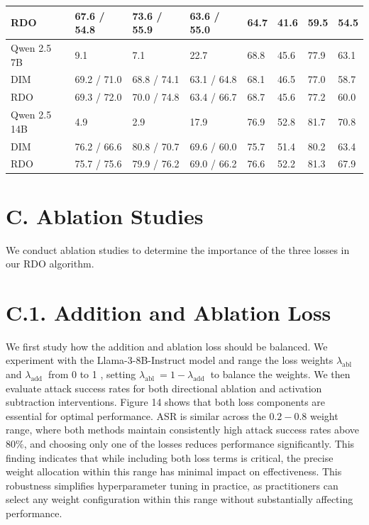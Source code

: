 \documentclass[10pt]{article}
\begin{document}
\begin{table}[h]
\begin{center}
\begin{tabular}{|l|l|l|l|l|l|l|l|}
\hline
RDO & 67.6 / 54.8 & 73.6 / 55.9 & 63.6 / 55.0 & 64.7 & 41.6 & 59.5 & 54.5 \\
\hline
Qwen 2.5 7B & 9.1 & 7.1 & 22.7 & 68.8 & 45.6 & 77.9 & 63.1 \\
\hline
DIM & 69.2 / 71.0 & 68.8 / 74.1 & 63.1 / 64.8 & 68.1 & 46.5 & 77.0 & 58.7 \\
\hline
RDO & 69.3 / 72.0 & 70.0 / 74.8 & 63.4 / 66.7 & 68.7 & 45.6 & 77.2 & 60.0 \\
\hline
Qwen 2.5 14B & 4.9 & 2.9 & 17.9 & 76.9 & 52.8 & 81.7 & 70.8 \\
\hline
DIM & 76.2 / 66.6 & 80.8 / 70.7 & 69.6 / 60.0 & 75.7 & 51.4 & 80.2 & 63.4 \\
\hline
RDO & 75.7 / 75.6 & 79.9 / 76.2 & 69.0 / 66.2 & 76.6 & 52.2 & 81.3 & 67.9 \\
\hline
\end{tabular}
\end{center}
\end{table}

\section*{C. Ablation Studies}
We conduct ablation studies to determine the importance of the three losses in our RDO algorithm.

\section*{C.1. Addition and Ablation Loss}
We first study how the addition and ablation loss should be balanced. We experiment with the Llama-3-8B-Instruct model and range the loss weights $\lambda_{\text {abl }}$ and $\lambda_{\text {add }}$ from 0 to 1 , setting $\lambda_{\text {abl }}=1-\lambda_{\text {add }}$ to balance the weights. We then evaluate attack success rates for both directional ablation and activation subtraction interventions. Figure 14 shows that both loss components are essential for optimal performance. ASR is similar across the $0.2-0.8$ weight range, where both methods maintain consistently high attack success rates above $80 \%$, and choosing only one of the losses reduces performance significantly. This finding indicates that while including both loss terms is critical, the precise weight allocation within this range has minimal impact on effectiveness. This robustness simplifies hyperparameter tuning in practice, as practitioners can select any weight configuration within this range without substantially affecting performance.
\end{document}
